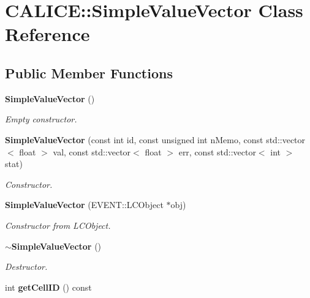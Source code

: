 \section{CALICE::SimpleValueVector Class Reference}
\label{classCALICE_1_1SimpleValueVector}
\subsection*{Public Member Functions}
\begin{DoxyCompactItemize}
\item 
{\bf SimpleValueVector} ()\label{classCALICE_1_1SimpleValueVector_afa0be915e346466caa53324b6a6ae7a5}

\begin{DoxyCompactList}\small\item\em Empty constructor. \item\end{DoxyCompactList}\item 
{\bf SimpleValueVector} (const int id, const unsigned int nMemo, const std::vector$<$ float $>$ val, const std::vector$<$ float $>$ err, const std::vector$<$ int $>$ stat)\label{classCALICE_1_1SimpleValueVector_a42768fcda4122561a2ef28daeb184a38}

\begin{DoxyCompactList}\small\item\em Constructor. \item\end{DoxyCompactList}\item 
{\bf SimpleValueVector} (EVENT::LCObject $\ast$obj)\label{classCALICE_1_1SimpleValueVector_af7c3b2490264f37cb1bc24044d2fb033}

\begin{DoxyCompactList}\small\item\em Constructor from LCObject. \item\end{DoxyCompactList}\item 
{\bf $\sim$SimpleValueVector} ()\label{classCALICE_1_1SimpleValueVector_a7f5753e348499618ee9b658608c4cdd6}

\begin{DoxyCompactList}\small\item\em Destructor. \item\end{DoxyCompactList}\item 
int {\bf getCellID} () const \label{classCALICE_1_1SimpleValueVector_adb8b0be370008186ea3e4750edbb1496}


\end{DoxyCompactItemize}
